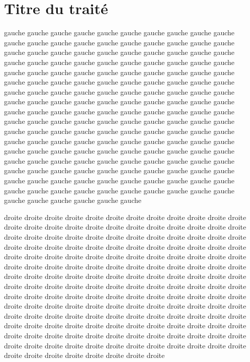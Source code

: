 \documentclass[openany]{book}
\begin{document}
\part*{Titre du traité}

\begin{pages}

\begin{Leftside}
  \beginnumbering



\pstart
gauche gauche gauche gauche gauche gauche gauche gauche gauche gauche
gauche gauche gauche gauche gauche gauche gauche gauche gauche gauche
gauche gauche gauche gauche gauche gauche gauche gauche gauche gauche
gauche gauche gauche gauche gauche gauche gauche gauche gauche gauche
gauche gauche gauche gauche gauche gauche gauche gauche gauche gauche
gauche gauche gauche gauche gauche gauche gauche gauche gauche gauche
gauche gauche gauche gauche gauche gauche gauche gauche gauche gauche
gauche gauche gauche gauche gauche gauche gauche gauche gauche gauche
gauche gauche gauche gauche gauche gauche gauche gauche gauche gauche
gauche gauche gauche gauche gauche gauche gauche gauche gauche gauche
gauche gauche gauche gauche gauche gauche gauche gauche gauche gauche
gauche gauche gauche gauche gauche gauche gauche gauche gauche gauche
gauche gauche gauche gauche gauche gauche gauche gauche gauche gauche
gauche gauche gauche gauche gauche gauche gauche gauche gauche gauche
gauche gauche gauche gauche gauche gauche gauche gauche gauche gauche
gauche gauche gauche gauche gauche gauche gauche gauche gauche gauche
gauche gauche gauche gauche gauche gauche gauche gauche gauche gauche
gauche gauche gauche gauche gauche gauche
\pend

  \endnumbering
\end{Leftside}

\begin{Rightside}
\beginnumbering


\pstart
droite droite droite droite droite droite droite droite droite droite
droite droite droite droite droite droite droite droite droite droite
droite droite droite droite droite droite droite droite droite droite
droite droite droite droite droite droite droite droite droite droite
droite droite droite droite droite droite droite droite droite droite
droite droite droite droite droite droite droite droite droite droite
droite droite droite droite droite droite droite droite droite droite
droite droite droite droite droite droite droite droite droite droite
droite droite droite droite droite droite droite droite droite droite
droite droite droite droite droite droite droite droite droite droite
droite droite droite droite droite droite droite droite droite droite
droite droite droite droite droite droite droite droite droite droite
droite droite droite droite droite droite droite droite droite droite
droite droite droite droite droite droite droite droite droite droite
droite droite droite droite droite droite droite droite droite droite
droite droite droite droite droite droite droite droite droite droite
droite droite droite droite droite droite droite droite droite droite
droite droite droite droite droite droite
\pend


\end{Rightside}
\end{pages}
\end{document}
